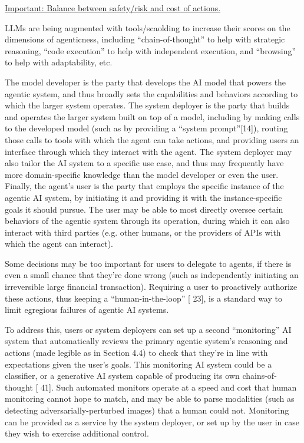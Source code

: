 \documentclass[10pt,a4paper]{article}
\begin{document}
\begin{multicols}{2}
\underline{Important: Balance between safety/risk and cost of actions.}

LLMs are being augmented with tools/scaolding to increase their scores on the dimensions of
agenticness, including “chain-of-thought” to help with strategic reasoning, “code execution” to help with independent
execution, and “browsing” to help with adaptability, etc. 

The model developer is the party that develops
the AI model that powers the agentic system, and thus broadly sets the capabilities and behaviors
according to which the larger system operates. The system deployer is the party that builds and
operates the larger system built on top of a model, including by making calls to the developed model
(such as by providing a “system prompt”[14]), routing those calls to tools with which the agent can
take actions, and providing users an interface through which they interact with the agent. The
system deployer may also tailor the AI system to a specific use case, and thus may frequently have
more domain-specific knowledge than the model developer or even the user. Finally, the agent’s user
is the party that employs the specific instance of the agentic AI system, by initiating it and providing
it with the instance-specific goals it should pursue. The user may be able to most directly oversee
certain behaviors of the agentic system through its operation, during which it can also interact with
third parties (e.g. other humans, or the providers of APIs with which the agent can interact).

Some decisions may be too important for users to delegate to agents, if there is even a small chance
that they’re done wrong (such as independently initiating an irreversible large financial transaction).
Requiring a user to proactively authorize these actions, thus keeping a “human-in-the-loop” [ 23], is
a standard way to limit egregious failures of agentic AI systems.

To address this, users or system deployers
can set up a second “monitoring” AI system that automatically reviews the primary agentic system’s
reasoning and actions (made legible as in Section 4.4) to check that they’re in line with expectations
given the user’s goals. This monitoring AI system could be a classifier, or a generative AI system
capable of producing its own chains-of-thought [ 41]. Such automated monitors operate at a speed
and cost that human monitoring cannot hope to match, and may be able to parse modalities (such
as detecting adversarially-perturbed images) that a human could not. Monitoring can be provided
as a service by the system deployer, or set up by the user in case they wish to exercise additional
control.


\end{multicols}
\end{document}
